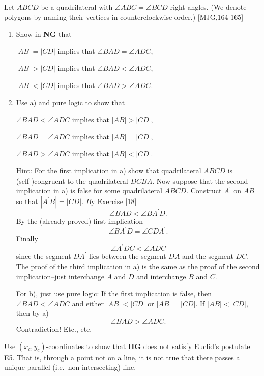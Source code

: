 \documentclass{ximera}
\begin{document}
\begin{exercise}
Let $ABCD$ be a quadrilateral with $\angle ABC=\angle BCD$
right angles. (We denote polygons by naming their vertices in counterclockwise
order.) [MJG,164-165]
\begin{enumerate}
\item Show in \textbf{NG} that

$\left\vert AB\right\vert =\left\vert CD\right\vert $ implies that $\angle
BAD=\angle ADC$,

$\left\vert AB\right\vert >\left\vert CD\right\vert $ implies that $\angle
BAD<\angle ADC$,

$\left\vert AB\right\vert <\left\vert CD\right\vert $ implies that $\angle
BAD>\angle ADC$.

\item Use a) and pure logic to show that

$\angle BAD<\angle ADC$ implies that $\left\vert AB\right\vert >\left\vert
CD\right\vert $,

$\angle BAD=\angle ADC$ implies that $\left\vert AB\right\vert =\left\vert
CD\right\vert $,

$\angle BAD>\angle ADC$ implies that $\left\vert AB\right\vert <\left\vert
CD\right\vert $.

Hint: For the first implication in a) show that quadrilateral $ABCD$ is
(self-)congruent to the quadrilateral $DCBA$. Now suppose that the second
implication in a) is false for some quadrilateral $ABCD$. Construct
$A^{\prime}$ on $\overline{AB}$ so that $\left\vert A^{\prime}B\right\vert
=\left\vert CD\right\vert $. $B$y Exercise \ref{18}%
\[
\angle BAD<\angle BA^{\prime}D.
\]
By the (already proved) first implication%
\[
\angle BA^{\prime}D=\angle CDA^{\prime}.
\]
Finally%
\[
\angle A^{\prime}DC<\angle ADC
\]
since the segment $DA^{\prime}$ lies between the segment $DA$ and the segment
$DC$. The proof of the third implication in a) is the same as the proof of
the second implication--just interchange $A$ and $D$ and interchange $B$ and
$C$.

For b), just use pure logic: If the first implication is false, then $\angle
BAD<\angle ADC$ and either $\left\vert AB\right\vert <\left\vert CD\right\vert
$ or $\left\vert AB\right\vert =\left\vert CD\right\vert $. If $\left\vert
AB\right\vert <\left\vert CD\right\vert $, then by a)%
\[
\angle BAD>\angle ADC.
\]
Contradiction! Etc., etc.
\end{enumerate}
\end{exercise}

\begin{exercise}
Use $\left(  x_{c},y_{c}\right)  $-coordinates to show that \textbf{HG} does
not satisfy Euclid's postulate E5. That is, through a point not on a line, it
is not true that there passes a unique parallel (i.e.\ non-intersecting) line.
\end{exercise}
\end{document}
